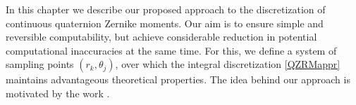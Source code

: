 In this chapter we describe our proposed approach to the discretization of continuous quaternion Zernike moments. Our aim is to ensure simple and reversible computability, but achieve considerable reduction in potential computational inaccuracies at the same time. For this, we define a system of sampling points $(r_k,\theta_j)$, over which the integral discretization \eqref{QZRMappr} maintains advantageous theoretical properties. The idea behind our approach is motivated by the work \cite{PapSchipp}.